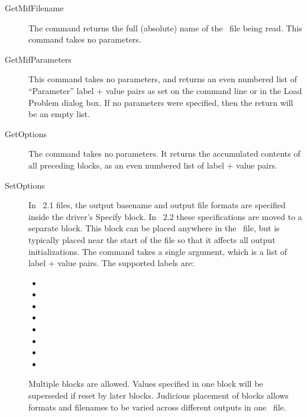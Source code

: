 \begin{description}
\item[GetMifFilename]
The  command returns the full (absolute) name of the
\MIF\ file being read.  This command takes no parameters.

\item[GetMifParameters]
This command takes no parameters, and returns an even numbered list of
``Parameter'' label + value pairs as set on the command line or in the
Load Problem dialog box.  If no parameters were specified, then the return
will be an empty list.

\item[GetOptions]
The  command takes no parameters.  It returns the
accumulated contents of all preceding  blocks, as an even
numbered list of label + value pairs.

\item[SetOptions]
In \MIF~2.1 files, the output basename and output file formats are
specified inside the driver's Specify block.  In \MIF~2.2 these
specifications are moved to a separate  block.  This
block can be placed anywhere in the \MIF\ file, but is typically placed
near the start of the file so that it affects all output
initializations.  The  command takes a single argument,
which is a list of label + value pairs.  The supported labels are:
\begin{itemize}
\item {}
\item {}
\item {}
\item {}
\item {}
\item {}
\item {}
\item {}
\end{itemize}
Multiple  blocks are allowed.  Values specified
in one  block will be superseded if reset by later
 blocks. Judicious placement of  blocks
allows formats and filenames to be varied across different outputs in
one \MIF\ file.


\end{description}
